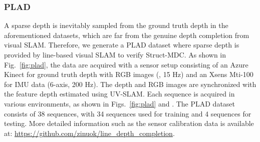 \subsubsection{\textcolor{color1}{PLAD}}
\textcolor{color1}{A} sparse depth is inevitably sampled from the ground truth depth in the aforementioned datasets, which \textcolor{color1}{are} far from \textcolor{color1}{the} genuine depth completion from visual SLAM. Therefore, we \textcolor{color1}{generate} a PLAD dataset where sparse depth is provided by line-based visual SLAM to verify Struct-MDC.
As shown in Fig.~\ref{fig:plad}, the data \textcolor{color1}{are} acquired with a sensor setup consisting of \textcolor{color1}{an} Azure Kinect for ground truth depth with RGB images (, 15 Hz) and \textcolor{color1}{an} Xsens Mti-100 for IMU data (6-axis, 200 Hz).
The depth and RGB images are synchronized with the feature depth estimated \textcolor{color1}{using} UV-SLAM. Each sequence is acquired in various environments, as shown in Figs.~\ref{fig:plad} and .
The PLAD \textcolor{color1}{dataset} consists of 38 sequences, with 34 sequences used for training and 4 sequences for testing. More detailed information \textcolor{color1}{such as the} sensor calibration data is available at: \url{https://github.com/zinuok/line_depth_completion}.



















